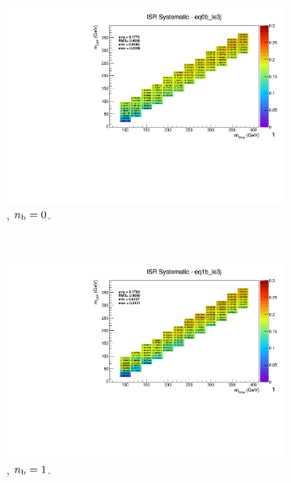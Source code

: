 \begin{figure}[ht!]
\begin{subfigure}[b]{0.32\textwidth}
    \includegraphics[width=\textwidth, page=1]{Figs/sms/t2degen/v19_2/systs/T2_4body_ISR_eq0b_le3j.pdf}
    \caption{\njlow, $n_{\text{b}} = 0$.}
  \end{subfigure}\\
  \begin{subfigure}[b]{0.32\textwidth}
    \includegraphics[width=\textwidth, page=12]{Figs/sms/t2degen/v19_2/systs/T2_4body_ISR_eq1b_le3j.pdf}
    \caption{\njlow, $n_{\text{b}} = 1$.}
  \end{subfigure}
  \begin{subfigure}[b]{0.32\textwidth}

\end{subfigure}
\end{figure}
